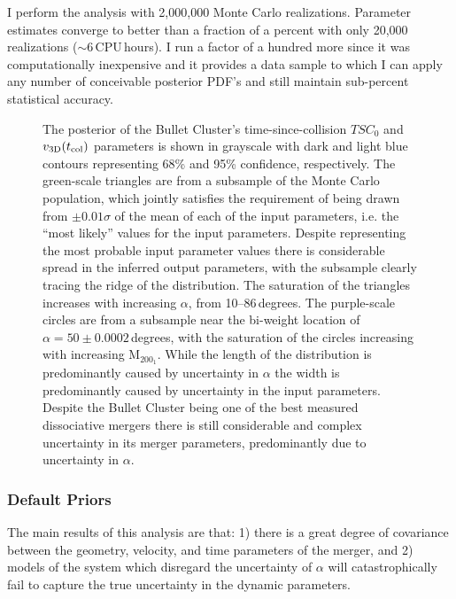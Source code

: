 \documentclass[12pt]{emulateapj}
\begin{document}
I perform the analysis with 2,000,000 Monte Carlo realizations.  
Parameter estimates converge to better than a fraction of a percent with only 20,000 realizations ($\sim6$\,CPU\,hours).
I run a factor of a hundred more since it was computationally inexpensive and it provides a data sample to which I can apply any number of conceivable posterior PDF's and still maintain sub-percent statistical accuracy.

\begin{figure}
\caption{
The posterior of the Bullet Cluster's time-since-collision $TSC_0$ and $v_{\rm 3D}(t_{\rm col})$ parameters is shown in grayscale with dark and light blue contours representing 68\% and 95\% confidence, respectively.
The green-scale triangles are from a subsample of the Monte Carlo population, which jointly satisfies the requirement of being drawn from $\pm 0.01 \sigma$ of the mean of each of the input parameters, i.e. the ``most likely'' values for the input parameters. 
Despite representing the most probable input parameter values there is considerable spread in the inferred output parameters, with the subsample clearly tracing the ridge of the distribution. 
The saturation of the triangles increases with increasing $\alpha$, from 10--86\,degrees.
The purple-scale circles are from a subsample near the bi-weight location of $\alpha=50\pm0.0002$\,degrees, with the saturation of the circles increasing with increasing M$_{200_1}$.
While the length of the distribution is predominantly caused by uncertainty in $\alpha$ the width is predominantly caused by uncertainty in the input parameters.
Despite the Bullet Cluster being one of the best measured dissociative mergers there is still considerable and complex uncertainty in its merger parameters, predominantly due to uncertainty in $\alpha$. 
\label{fig_bcTSC}}
\end{figure}


\subsubsection{Default Priors}\label{sec_defaultprior}

The main results of this analysis are that: 1) there is a great degree of covariance between the geometry, velocity, and time parameters of the merger, and 2) models of the system which disregard the uncertainty of $\alpha$ will catastrophically fail to capture the true uncertainty in the dynamic parameters.
\end{document}
